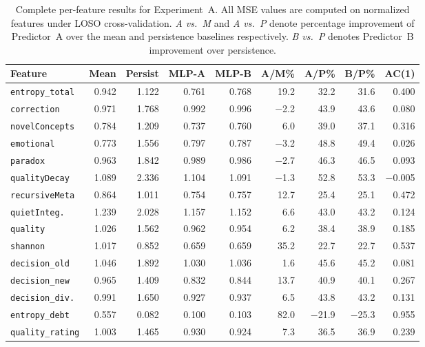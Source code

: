 \documentclass[twoside,11pt]{article}
\begin{document}
\begin{table}[h]
\caption{Complete per-feature results for Experiment~A. All MSE values are
computed on normalized features under LOSO cross-validation. \emph{A vs.\ M}
and \emph{A vs.\ P} denote percentage improvement of Predictor~A over the mean
and persistence baselines respectively. \emph{B vs.\ P} denotes Predictor~B
improvement over persistence.}
\label{tab:full-results}
\centering
\small
\begin{tabular}{@{}lrrrrrrrr@{}}
\toprule
Feature & Mean & Persist & MLP-A & MLP-B & A/M\% & A/P\% & B/P\% & AC(1) \\
\midrule
\texttt{entropy\_total}    & 0.942 & 1.122 & 0.761 & 0.768 & 19.2 & 32.2 & 31.6 & 0.400 \\
\texttt{correction}        & 0.971 & 1.768 & 0.992 & 0.996 & $-$2.2 & 43.9 & 43.6 & 0.080 \\
\texttt{novelConcepts}     & 0.784 & 1.209 & 0.737 & 0.760 & 6.0 & 39.0 & 37.1 & 0.316 \\
\texttt{emotional}         & 0.773 & 1.556 & 0.797 & 0.787 & $-$3.2 & 48.8 & 49.4 & 0.026 \\
\texttt{paradox}           & 0.963 & 1.842 & 0.989 & 0.986 & $-$2.7 & 46.3 & 46.5 & 0.093 \\
\texttt{qualityDecay}      & 1.089 & 2.336 & 1.104 & 1.091 & $-$1.3 & 52.8 & 53.3 & $-$0.005 \\
\texttt{recursiveMeta}     & 0.864 & 1.011 & 0.754 & 0.757 & 12.7 & 25.4 & 25.1 & 0.472 \\
\texttt{quietInteg.}       & 1.239 & 2.028 & 1.157 & 1.152 & 6.6 & 43.0 & 43.2 & 0.124 \\
\texttt{quality}           & 1.026 & 1.562 & 0.962 & 0.954 & 6.2 & 38.4 & 38.9 & 0.185 \\
\texttt{shannon}           & 1.017 & 0.852 & 0.659 & 0.659 & 35.2 & 22.7 & 22.7 & 0.537 \\
\texttt{decision\_old}     & 1.046 & 1.892 & 1.030 & 1.036 & 1.6 & 45.6 & 45.2 & 0.081 \\
\texttt{decision\_new}     & 0.965 & 1.409 & 0.832 & 0.844 & 13.7 & 40.9 & 40.1 & 0.267 \\
\texttt{decision\_div.}    & 0.991 & 1.650 & 0.927 & 0.937 & 6.5 & 43.8 & 43.2 & 0.131 \\
\texttt{entropy\_debt}     & 0.557 & 0.082 & 0.100 & 0.103 & 82.0 & $-$21.9 & $-$25.3 & 0.955 \\
\texttt{quality\_rating}   & 1.003 & 1.465 & 0.930 & 0.924 & 7.3 & 36.5 & 36.9 & 0.239 \\

\end{tabular}
\end{table}
\end{document}
